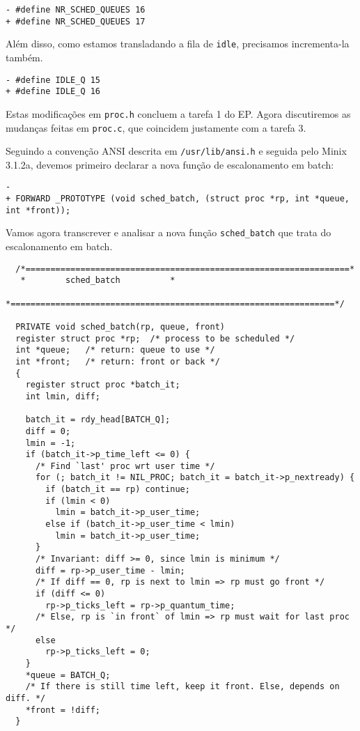 \documentclass{amsart}
\theoremstyle{plain}
\newcommand{\code}[1]{\lstinline[mathescape=true]{#1}}
\begin{document}
\begin{lstlisting}[frame=leftline,mathescape=true,style=nonumbers]
- #define NR_SCHED_QUEUES 16
+ #define NR_SCHED_QUEUES 17
\end{lstlisting}

Além disso, como estamos transladando a fila de \code{idle}, precisamos incrementa-la também.

\begin{lstlisting}[frame=leftline,mathescape=true,style=nonumbers]
- #define IDLE_Q 15
+ #define IDLE_Q 16
\end{lstlisting}

Estas modificações em \code{proc.h} concluem a tarefa 1 do EP\@. Agora discutiremos as mudanças
feitas em \code{proc.c}, que coincidem justamente com a tarefa 3.

Seguindo a convenção ANSI descrita em \code{/usr/lib/ansi.h} e seguida pelo Minix 3.1.2a, devemos
primeiro declarar a nova função de escalonamento em batch:

\begin{lstlisting}[frame=leftline,mathescape=true,style=nonumbers]
-
+ FORWARD _PROTOTYPE (void sched_batch, (struct proc *rp, int *queue, int *front));
\end{lstlisting}

Vamos agora transcrever e analisar a nova função \code{sched_batch} que trata do escalonamento em
batch.

\begin{verbatim}
  /*=================================================================*
   *        sched_batch          *
   *=================================================================*/

  PRIVATE void sched_batch(rp, queue, front)
  register struct proc *rp;  /* process to be scheduled */
  int *queue;   /* return: queue to use */
  int *front;   /* return: front or back */
  {
    register struct proc *batch_it;
    int lmin, diff;

    batch_it = rdy_head[BATCH_Q];
    diff = 0;
    lmin = -1;
    if (batch_it->p_time_left <= 0) {
      /* Find `last' proc wrt user time */
      for (; batch_it != NIL_PROC; batch_it = batch_it->p_nextready) {
        if (batch_it == rp) continue;
        if (lmin < 0)
          lmin = batch_it->p_user_time;
        else if (batch_it->p_user_time < lmin)
          lmin = batch_it->p_user_time;
      }
      /* Invariant: diff >= 0, since lmin is minimum */
      diff = rp->p_user_time - lmin;
      /* If diff == 0, rp is next to lmin => rp must go front */
      if (diff <= 0)
        rp->p_ticks_left = rp->p_quantum_time;
      /* Else, rp is `in front` of lmin => rp must wait for last proc */
      else
        rp->p_ticks_left = 0;
    }
    *queue = BATCH_Q;
    /* If there is still time left, keep it front. Else, depends on diff. */
    *front = !diff;
  }
\end{verbatim}
\end{document}
